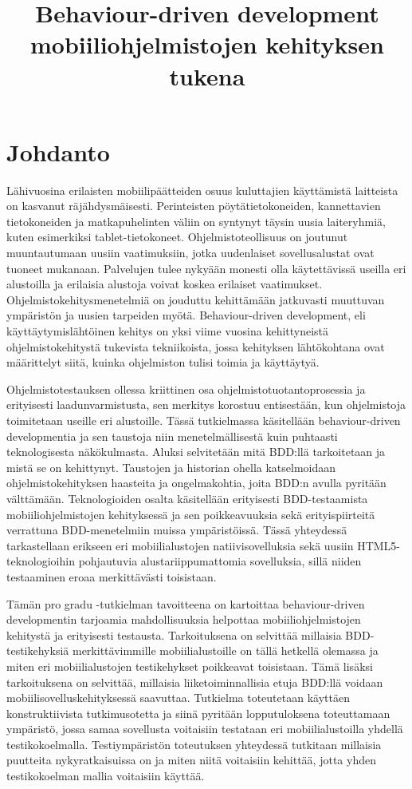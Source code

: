 \documentclass[finnish,nonumbib,nocopyright]{gradu2}
\title{Behaviour-driven development mobiiliohjelmistojen kehityksen tukena}
\begin{document}
\mainmatter

\chapter{Johdanto}

Lähivuosina erilaisten mobiilipäätteiden osuus kuluttajien käyttämistä laitteista on kasvanut räjähdysmäisesti. Perinteisten pöytätietokoneiden, kannettavien tietokoneiden ja matkapuhelinten väliin on syntynyt täysin uusia laiteryhmiä, kuten esimerkiksi tablet-tietokoneet. Ohjelmistoteollisuus on joutunut muuntautumaan uusiin vaatimuksiin, jotka uudenlaiset sovellusalustat ovat tuoneet mukanaan. Palvelujen tulee nykyään monesti olla käytettävissä useilla eri alustoilla ja erilaisia alustoja voivat koskea erilaiset vaatimukset. Ohjelmistokehitysmenetelmiä on jouduttu kehittämään jatkuvasti muuttuvan ympäristön ja uusien tarpeiden myötä. Behaviour-driven development, eli käyttäytymislähtöinen kehitys on yksi viime vuosina kehittyneistä ohjelmistokehitystä tukevista tekniikoista, jossa kehityksen lähtökohtana ovat määrittelyt siitä, kuinka ohjelmiston tulisi toimia ja käyttäytyä.

Ohjelmistotestauksen ollessa kriittinen osa ohjelmistotuotantoprosessia ja erityisesti laadunvarmistusta, sen merkitys korostuu entisestään, kun ohjelmistoja toimitetaan useille eri alustoille. Tässä tutkielmassa käsitellään behaviour-driven developmentia ja sen taustoja niin menetelmällisestä kuin puhtaasti teknologisesta näkökulmasta. Aluksi selvitetään mitä BDD:llä tarkoitetaan ja mistä se on kehittynyt. Taustojen ja historian ohella katselmoidaan ohjelmistokehityksen haasteita ja ongelmakohtia, joita BDD:n avulla pyritään välttämään. Teknologioiden osalta käsitellään erityisesti BDD-testaamista mobiiliohjelmistojen kehityksessä ja sen poikkeavuuksia sekä erityispiirteitä verrattuna BDD-menetelmiin muissa ympäristöissä. Tässä yhteydessä tarkastellaan erikseen eri mobiilialustojen natiivisovelluksia sekä uusiin HTML5-teknologioihin pohjautuvia alustariippumattomia sovelluksia, sillä niiden testaaminen eroaa merkittävästi toisistaan. 

Tämän pro gradu -tutkielman tavoitteena on kartoittaa behaviour-driven developmentin tarjoamia mahdollisuuksia helpottaa mobiiliohjelmistojen kehitystä ja erityisesti testausta. Tarkoituksena on selvittää millaisia BDD-testikehyksiä merkittävimmille mobiilialustoille on tällä hetkellä olemassa ja miten eri mobiilialustojen testikehykset poikkeavat toisistaan. Tämä lisäksi tarkoituksena on selvittää, millaisia liiketoiminnallisia etuja BDD:llä voidaan mobiilisovelluskehityksessä saavuttaa. Tutkielma toteutetaan käyttäen konstruktiivista tutkimusotetta ja siinä pyritään lopputuloksena toteuttamaan ympäristö, jossa samaa sovellusta voitaisiin testataan eri mobiilialustoilla yhdellä testikokoelmalla. Testiympäristön toteutuksen yhteydessä tutkitaan millaisia puutteita nykyratkaisuissa on ja miten niitä voitaisiin kehittää, jotta yhden testikokoelman mallia voitaisiin käyttää.
\end{document}
